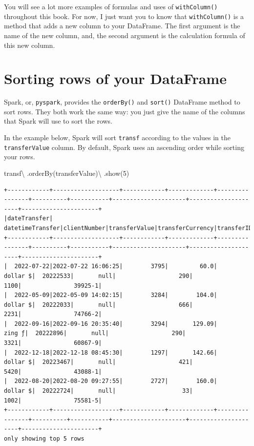 \documentclass[
  11pt,
  letterpaper,
  DIV=11,
  numbers=noendperiod]{scrreprt}
\newenvironment{Shaded}{\begin{snugshade}}{\end{snugshade}}
\newcommand{\DecValTok}[1]{\textcolor[rgb]{0.68,0.00,0.00}{#1}}
\newcommand{\NormalTok}[1]{\textcolor[rgb]{0.00,0.23,0.31}{#1}}
\newcommand{\OperatorTok}[1]{\textcolor[rgb]{0.37,0.37,0.37}{#1}}
\newcommand{\StringTok}[1]{\textcolor[rgb]{0.13,0.47,0.30}{#1}}
\begin{document}
You will see a lot more examples of formulas and uses of
\texttt{withColumn()} throughout this book. For now, I just want you to
know that \texttt{withColumn()} is a method that adds a new column to
your DataFrame. The first argument is the name of the new column, and,
the second argument is the calculation formula of this new column.

\hypertarget{sorting-rows-of-your-dataframe}{%
\section{Sorting rows of your
DataFrame}\label{sorting-rows-of-your-dataframe}}

Spark, or, \texttt{pyspark}, provides the \texttt{orderBy()} and
\texttt{sort()} DataFrame method to sort rows. They both work the same
way: you just give the name of the columns that Spark will use to sort
the rows.

In the example below, Spark will sort \texttt{transf} according to the
values in the \texttt{transferValue} column. By default, Spark uses an
ascending order while sorting your rows.

\begin{Shaded}
\begin{Highlighting}[]
\NormalTok{transf}\OperatorTok{\textbackslash{}}
\NormalTok{  .orderBy(}\StringTok{\textquotesingle{}transferValue\textquotesingle{}}\NormalTok{)}\OperatorTok{\textbackslash{}}
\NormalTok{  .show(}\DecValTok{5}\NormalTok{)}
\end{Highlighting}
\end{Shaded}

\begin{verbatim}
+------------+-------------------+------------+-------------+----------------+----------+-----------+---------------------+---------------------+----------------------+
|dateTransfer|   datetimeTransfer|clientNumber|transferValue|transferCurrency|transferID|transferLog|destinationBankNumber|destinationBankBranch|destinationBankAccount|
+------------+-------------------+------------+-------------+----------------+----------+-----------+---------------------+---------------------+----------------------+
|  2022-07-22|2022-07-22 16:06:25|        3795|         60.0|        dollar $|  20222533|       null|                  290|                 1100|               39925-1|
|  2022-05-09|2022-05-09 14:02:15|        3284|        104.0|        dollar $|  20222033|       null|                  666|                 2231|               74766-2|
|  2022-09-16|2022-09-16 20:35:40|        3294|       129.09|          zing ƒ|  20222896|       null|                  290|                 3321|               60867-9|
|  2022-12-18|2022-12-18 08:45:30|        1297|       142.66|        dollar $|  20223467|       null|                  421|                 5420|               43088-1|
|  2022-08-20|2022-08-20 09:27:55|        2727|        160.0|        dollar $|  20222724|       null|                   33|                 1002|               75581-5|
+------------+-------------------+------------+-------------+----------------+----------+-----------+---------------------+---------------------+----------------------+
only showing top 5 rows
\end{verbatim}
\end{document}
